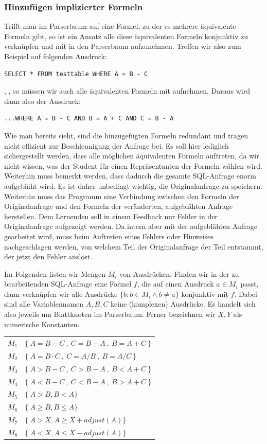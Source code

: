 \subsubsection{Hinzufügen implizierter Formeln}

Trifft man im Parserbaum auf eine Formel, zu der es mehrere äquivalente Formeln gibt, so ist ein Ansatz alle diese äquivalenten Formeln konjunktiv zu verknüpfen und mit in den Parserbaum aufzunehmen. Treffen wir also zum Beispiel auf folgenden Ausdruck: \begin{verbatim}SELECT * FROM testtable WHERE A = B - C\end{verbatim}, , so müssen wir auch alle äquivalenten Formeln mit aufnehmen. Daraus wird dann also der Ausdruck: \begin{verbatim}...WHERE A = B - C AND B = A + C AND C = B - A\end{verbatim}

Wie man bereits sieht, sind die hinzugefügten Formeln redundant und tragen nicht effizient zur Beschleunigung der Anfrage bei. Es soll hier lediglich sichergestellt werden, dass alle möglichen äquivalenten Formeln auftreten, da wir nicht wissen, was der Student für einen Repräsentanten der Formeln wählen wird. Weiterhin muss bemerkt werden, dass dadurch die gesamte SQL-Anfrage enorm aufgebläht wird. Es ist daher unbedingt wichtig, die Originalanfrage zu speichern. Weiterhin muss das Programm eine Verbindung zwischen den Formeln der Originalanfrage und den Formeln der veränderten, aufgeblähten Anfrage herstellen. Dem Lernenden soll in einem Feedback nur Fehler in der Originalanfrage aufgezeigt werden. Da intern aber mit der aufgeblähten Anfrage gearbeitet wird, muss beim Auftreten eines Fehlers oder Hinweises nachgeschlagen werden, von welchem Teil der Originalanfrage der Teil entstammt, der jetzt den Fehler auslöst.

Im Folgenden listen wir Mengen $M_i$ von Ausdrücken. Finden wir in der zu bearbeitenden SQL-Anfrage eine Formel $f$, die auf einen Ausdruck $a\in M_i$ passt, dann verknüpfen wir alle Ausdrücke $\{b : b\in M_i \wedge b \neq a\}$ konjunktiv mit $f$. Dabei sind alle Variablennamen $A,B,C$ keine (komplexen) Ausdrücke. Es handelt sich also jeweils um Blattknoten im Parserbaum. Ferner bezeichnen wir $X,Y$ als numerische Konstanten.\\

\begin{tabular}{ll}
$M_1$ & $\{\ A=B-C\ ,\ C=B-A\ ,\ B=A+C\ \}$\\
$M_2$ & $\{\ A=B\cdot C\ ,\ C=A / B\ ,\ B=A / C\ \}$\\
$M_3$ & $\{\ A>B-C\ ,\ C>B-A\ ,\ B<A+C\ \}$\\
$M_4$ & $\{\ A<B-C\ ,\ C<B-A\ ,\ B>A+C\ \}$\\
$M_5$ & $\{\ A>B, B<A \}$\\
$M_6$ & $\{\ A\geq B, B\leq A \}$\\
$M_7$ & $\{\ A>X, A\geq X+\mathit{adjust}(A) \}$\\
$M_8$ & $\{\ A<X, A\leq X-\mathit{adjust}(A) \}$\\

\end{tabular}

